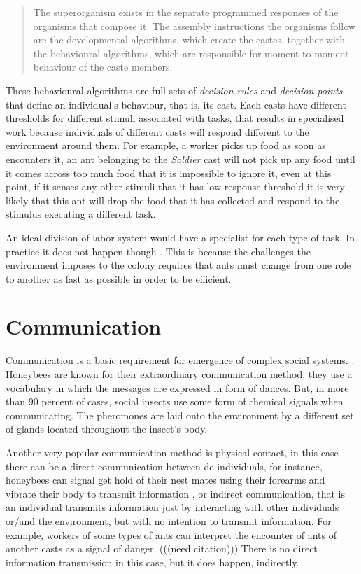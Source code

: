 \begin{quotation}The superorganism exists in the separate programmed responses of the organisms that compose it. The assembly instructions the organisms follow are the developmental algorithms, which create the castes, together with the behavioural algorithms, which are responsible for moment-to-moment behaviour of the caste members.
\end{quotation}


These behavioural algorithms are full sets of \emph{decision rules} and \emph{decision points} that define an individual's behaviour, that is, its cast. Each casts have different thresholds for different stimuli associated with tasks, that results in specialised work because individuals of different casts will respond different to the environment around them. For example, a worker picks up food as soon as encounters it, an ant belonging to the \emph{Soldier} cast will not pick up any food until it comes across too much food that it is impossible to ignore it, even at this point, if it senses any other stimuli that it has low response threshold it is very likely that this ant will drop the food that it has collected and respond to the stimulus executing a different task.

An ideal division of labor system would have a specialist for each type of task. In practice it does not happen though \cite{wilson1968} \cite{oster1979caste}. This is because the challenges the environment imposes to the colony requires that ants must change from one role to another as fast as possible in order to be efficient.

\section {Communication}
\label{sec:ant-comm}

Communication is a basic requirement for emergence of complex social systems. \cite{seeley1995wisdom}. Honeybees are known for their extraordinary communication method, they use a vocabulary in which the messages are expressed in form of dances. \cite{Bienentanz} But, in more than 90 percent of cases, social insects use some form of chemical signals when communicating. \cite{citeulike:3731267} The pheromones are laid onto the environment by a different set of glands located throughout the insect's body. 

Another very popular communication method is physical contact, in this case there can be a direct communication between de individuals, for instance, honeybees can signal get hold of their nest mates using their forearms and vibrate their body to transmit information \cite{allen1959}, or indirect communication, that is an individual transmits information just by interacting with other individuals or/and the environment, but with no intention to transmit information. For example, workers of some types of ants can interpret the encounter of ants of another casts as a signal of danger. (((need citation))) There is no direct information transmission in this case, but it does happen, indirectly.


